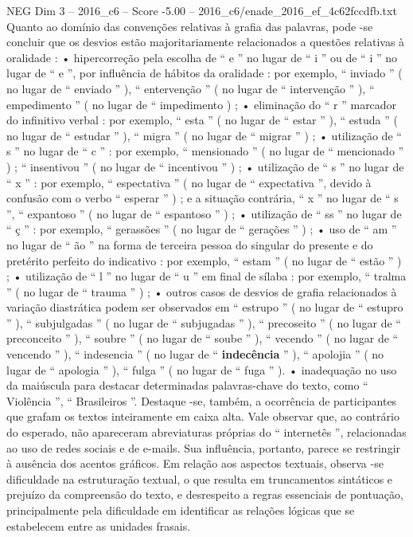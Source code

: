 \begin{textsample}{NEG Dim 3 – 2016\_c6 – Score -5.00 – 2016\_c6/enade\_2016\_ef\_4c62fccdfb.txt}
Quanto ao domínio das convenções relativas à grafia das palavras, pode -se concluir que os desvios estão majoritariamente relacionados a questões relativas à oralidade : • hipercorreção pela escolha de “ e ” no lugar de “ i ” ou de “ i ” no lugar de “ e ”, por influência de hábitos da oralidade : por exemplo, “ inviado ” ( no lugar de “ enviado ” ), “ entervenção ” ( no lugar de “ intervenção ” ), “ empedimento ” ( no lugar de “ impedimento ) ; • eliminação do “ r ” marcador do infinitivo verbal : por exemplo, “ esta ” ( no lugar de “ estar ” ), “ estuda ” ( no lugar de “ estudar ” ), “ migra ” ( no lugar de “ migrar ” ) ; • utilização de “ s ” no lugar de “ c ” : por exemplo, “ mensionado ” ( no lugar de “ mencionado ” ) ; “ insentivou ” ( no lugar de “ incentivou ” ) ; • utilização de “ s ” no lugar de “ x ” : por exemplo, “ espectativa ” ( no lugar de “ expectativa ”, devido à confusão com o verbo “ esperar ” ) ; e a situação contrária, “ x ” no lugar de “ s ”, “ expantoso ” ( no lugar de “ espantoso ” ) ; • utilização de “ ss ” no lugar de “ ç ” : por exemplo, “ gerassões ” ( no lugar de “ gerações ” ) ; • uso de “ am ” no lugar de “ ão ” na forma de terceira pessoa do singular do presente e do pretérito perfeito do indicativo : por exemplo, “ estam ” ( no lugar de “ estão ” ) ; • utilização de “ l ” no lugar de “ u ” em final de sílaba : por exemplo, “ tralma ” ( no lugar de “ trauma ” ) ; • outros casos de desvios de grafia relacionados à variação diastrática podem ser observados em “ estrupo ” ( no lugar de “ estupro ” ), “ subjulgadas ” ( no lugar de “ subjugadas ” ), “ precoseito ” ( no lugar de “ preconceito ” ), “ soubre ” ( no lugar de “ soube ” ), “ vecendo ” ( no lugar de “ vencendo ” ), “ indesencia ” ( no lugar de “ \textbf{indecência} ” ), “ apolojia ” ( no lugar de “ apologia ” ), “ fulga ” ( no lugar de “ fuga ” ). • inadequação no uso da maiúscula para destacar determinadas palavras-chave do texto, como “ Violência ”, “ Brasileiros ”.
Destaque -se, também, a ocorrência de participantes que grafam os textos inteiramente em caixa alta.
Vale observar que, ao contrário do esperado, não apareceram abreviaturas próprias do “ internetês ”, relacionadas ao uso de redes sociais e de e-mails.
Sua influência, portanto, parece se restringir à ausência dos acentos gráficos.
Em relação aos aspectos textuais, observa -se dificuldade na estruturação textual, o que resulta em truncamentos sintáticos e prejuízo da compreensão do texto, e desrespeito a regras essenciais de pontuação, principalmente pela dificuldade em identificar as relações lógicas que se estabelecem entre as unidades frasais.

\end{textsample}
